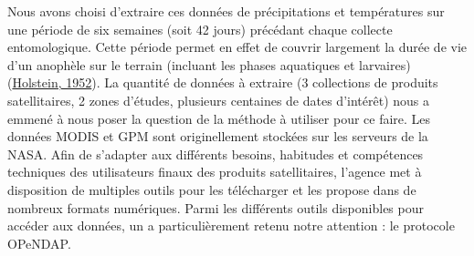 \documentclass[12pt,twoside]{reedthesis}
\begin{document}
Nous avons choisi d'extraire ces données de précipitations et températures sur une période de six semaines (soit 42 jours) précédant chaque collecte entomologique. Cette période permet en effet de couvrir largement la durée de vie d'un anophèle sur le terrain (incluant les phases aquatiques et larvaires) (\protect\hyperlink{ref-holstein_biologie_1952}{Holstein, 1952}). La quantité de données à extraire (3 collections de produits satellitaires, 2 zones d'études, plusieurs centaines de dates d'intérêt) nous a emmené à nous poser la question de la méthode à utiliser pour ce faire. Les données MODIS et GPM sont originellement stockées sur les serveurs de la NASA. Afin de s'adapter aux différents besoins, habitudes et compétences techniques des utilisateurs finaux des produits satellitaires, l'agence met à disposition de multiples outils pour les télécharger et les propose dans de nombreux formats numériques. Parmi les différents outils disponibles pour accéder aux données, un a particulièrement retenu notre attention : le protocole OPeNDAP.\\
\end{document}

